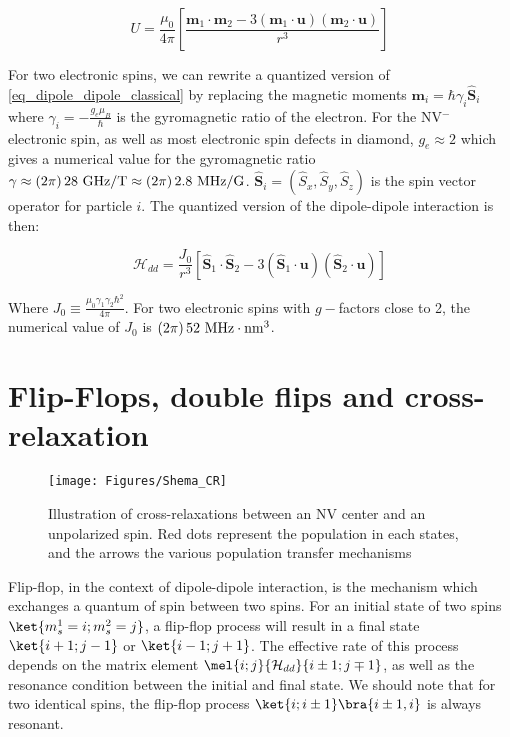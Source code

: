 \documentclass[a4paper]{report}
\begin{document}
\begin{equation}
\label{eq_dipole_dipole_classical}
U=\frac{\mu_0}{4 \pi}\left[ \frac{ \mathbf{m}_1\cdot\mathbf{m}_2 - 3 (\mathbf{m}_1\cdot\mathbf{u})(\mathbf{m}_2\cdot\mathbf{u})}{r^3}\right]
\end{equation}

For two electronic spins, we can rewrite a quantized version of \ref{eq_dipole_dipole_classical} by replacing the magnetic moments $\mathbf{m}_i=\hbar \gamma_i \hat{\mathbf{S}}_i$ where $\gamma_i=-\frac{g_e \mu_B}{\hbar}$ is the gyromagnetic ratio of the electron. For the NV$^-$ electronic spin, as well as most electronic spin defects in diamond, $g_e\approx 2$ which gives a numerical value for the gyromagnetic ratio $\gamma \approx (2\pi)\,28\ \rm{GHz/T} \approx (2\pi)\,2.8\ \rm MHz/G$. $\hat{\mathbf{S}}_i=(\hat S_x, \hat S_y, \hat S_z)$ is the spin vector operator for particle $i$. The quantized version of the dipole-dipole interaction is then:

\begin{equation}
\mathcal{H}_{dd}=\frac{J_0}{r^3}\left[ \hat{\mathbf{S}}_1\cdot\hat{\mathbf{S}}_2 - 3 (\hat{\mathbf{S}}_1\cdot\mathbf{u})(\hat{\mathbf{S}}_2\cdot\mathbf{u})\right]
\end{equation}

Where $J_0\equiv \frac{\mu_0\gamma_1\gamma_2 \hbar^2}{4\pi}$. For two electronic spins with $g-$factors close to 2, the numerical value of $J_0$ is $(2\pi)\,52\ \rm{MHz}\cdot\rm{nm}^3$.

\section{Flip-Flops, double flips and cross-relaxation}

\begin{figure}
\texttt{[image: Figures/Shema\_CR]}
\caption{Illustration of cross-relaxations between an NV center and an unpolarized spin. Red dots represent the population in each states, and the arrows the various population transfer mechanisms}
\label{CR_shema}
\end{figure}

Flip-flop, in the context of dipole-dipole interaction, is the mechanism which exchanges a quantum of spin between two spins. For an initial state of two spins $\ket{m_s^1=i;m_s^2=j}$, a flip-flop process will result in a final state $\ket{i+1;j-1}$ or $\ket{i-1;j+1}$. The effective rate of this process depends on the matrix element $\mel{i;j}{\mathcal{H}_{dd}}{i\pm 1;j \mp 1}$, as well as the resonance condition between the initial and final state. We should note that for two identical spins, the flip-flop process $\ket{i;i\pm 1}\bra{i\pm 1,i}$ is always resonant.
\end{document}
